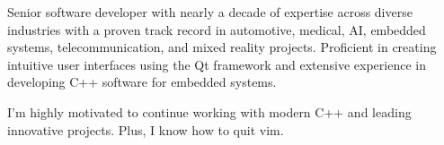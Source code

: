 

\begin{cvparagraph}

Senior software developer with nearly a decade of expertise across diverse industries with a proven track record in automotive, medical, AI, embedded systems, telecommunication, and mixed reality projects. Proficient in creating intuitive user interfaces using the Qt framework and extensive experience in developing C++ software for embedded systems.

I'm highly motivated to continue working with modern C++ and leading innovative projects. \newline
Plus, I know how to quit vim.

\end{cvparagraph}
